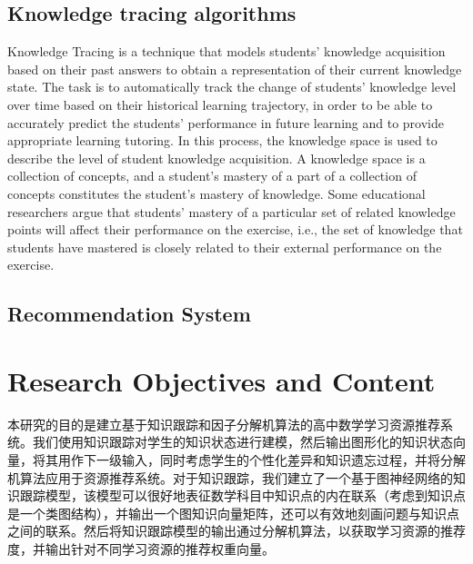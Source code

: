 \subsection{Knowledge tracing algorithms}
Knowledge Tracing is a technique that models students' knowledge acquisition based on their past answers to obtain a representation of their current knowledge state. The task is to automatically track the change of students' knowledge level over time based on their historical learning trajectory, in order to be able to accurately predict the students' performance in future learning and to provide appropriate learning tutoring. In this process, the knowledge space is used to describe the level of student knowledge acquisition. A knowledge space is a collection of concepts, and a student's mastery of a part of a collection of concepts constitutes the student's mastery of knowledge. Some educational researchers argue that students' mastery of a particular set of related knowledge points will affect their performance on the exercise, i.e., the set of knowledge that students have mastered is closely related to their external performance on the exercise.


\subsection{Recommendation System}


\section{Research Objectives and Content}  %
本研究的目的是建立基于知识跟踪和因子分解机算法的高中数学学习资源推荐系统。我们使用知识跟踪对学生的知识状态进行建模，然后输出图形化的知识状态向量，将其用作下一级输入，同时考虑学生的个性化差异和知识遗忘过程，并将分解机算法应用于资源推荐系统。对于知识跟踪，我们建立了一个基于图神经网络的知识跟踪模型，该模型可以很好地表征数学科目中知识点的内在联系（考虑到知识点是一个类图结构），并输出一个图知识向量矩阵，还可以有效地刻画问题与知识点之间的联系。然后将知识跟踪模型的输出通过分解机算法，以获取学习资源的推荐度，并输出针对不同学习资源的推荐权重向量。

